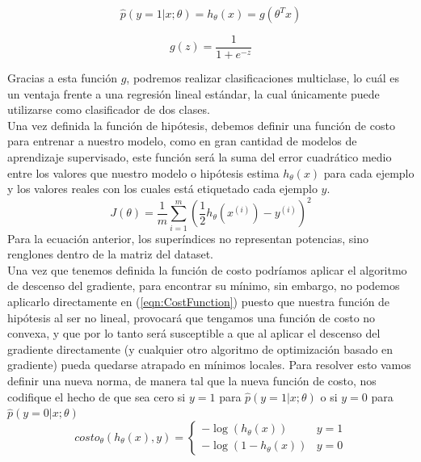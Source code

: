 \documentclass[runningheads]{llncs}
\begin{document}
\begin{equation}
    \hat{p}(y = 1| x;\theta) = h_{\theta}(x) = g(\theta^{T}x)
    \label{eqn:EstimatedProbability}
\end{equation}


\begin{equation}
    g(z) = \frac{1}{1 + e^{-z}}
    \label{eqn:LogisticFunction}
\end{equation}

Gracias a esta función $g$, podremos realizar clasificaciones multiclase, lo cuál es un ventaja frente a una regresión lineal estándar, la cual únicamente puede utilizarse como clasificador de dos clases.\\
Una vez definida la función de hipótesis, debemos definir una función de costo para entrenar a nuestro modelo, como en gran cantidad de modelos de aprendizaje supervisado, este función será la suma del error cuadrático medio entre los valores que nuestro modelo o hipótesis estima $h_{\theta}(x)$ para cada ejemplo y los valores reales con los cuales está etiquetado cada ejemplo $y$.
\begin{equation}
    J(\theta) = \frac{1}{m}\sum_{i = 1}^{m}(\frac{1}{2}h_{\theta}(x^{(i)}) - y^{(i)})^2
    \label{eqn:CostFunction}
\end{equation}
Para la ecuación anterior, los superíndices no representan potencias, sino renglones dentro de la matriz del dataset.\\
Una vez que tenemos definida la función de costo podríamos aplicar el algoritmo de descenso del gradiente, para encontrar su mínimo, sin embargo, no podemos aplicarlo directamente en (\ref{eqn:CostFunction}) puesto que nuestra función de hipótesis al ser no lineal, provocará que tengamos una función de costo no convexa, y que por lo tanto será susceptible a que al aplicar el descenso del gradiente directamente (y cualquier otro algoritmo de optimización basado en gradiente) pueda quedarse atrapado en mínimos locales. Para resolver esto vamos definir una nueva norma, de manera tal que la nueva función de costo, nos codifique el hecho de que sea cero si $y = 1$ para $\hat{p}(y = 1| x;\theta)$ o si $y = 0$ para $\hat{p}(y = 0| x;\theta)$
\begin{equation}
    costo_{\theta}(h_{\theta}(x), y) = \begin{cases} 
      -\log(h_{\theta}(x)) & y = 1 \\
      -\log(1 - h_{\theta}(x)) & y = 0
   \end{cases}
\end{equation}
\end{document}
